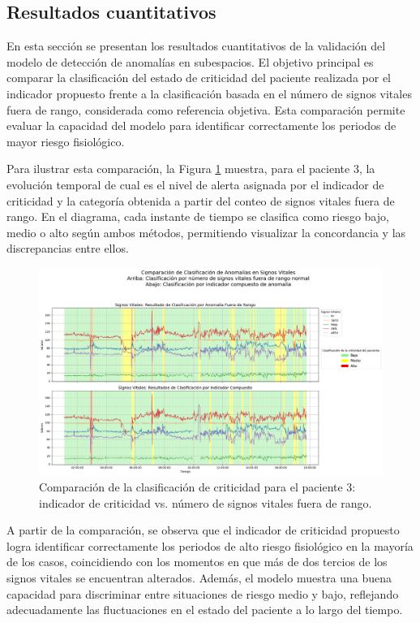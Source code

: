 \subsection{Resultados cuantitativos}

En esta sección se presentan los resultados cuantitativos de la validación del modelo de detección de anomalías en subespacios. El objetivo principal es comparar la clasificación del estado de criticidad del paciente realizada por el indicador propuesto frente a la clasificación basada en el número de signos vitales fuera de rango, considerada como referencia objetiva. Esta comparación permite evaluar la capacidad del modelo para identificar correctamente los periodos de mayor riesgo fisiológico.

Para ilustrar esta comparación, la Figura \ref{fig:comparacion_clasificacion_paciente3} muestra, para el paciente 3, la evolución temporal de cual es el nivel de alerta asignada por el indicador de criticidad y la categoría obtenida a partir del conteo de signos vitales fuera de rango. En el diagrama, cada instante de tiempo se clasifica como riesgo bajo, medio o alto según ambos métodos, permitiendo visualizar la concordancia y las discrepancias entre ellos.

\begin{figure}[ht]
  \centering
  \includegraphics[width=\textwidth]{Images/comparacion_indicador_con_fuera_de_rango.png}
  \caption{Comparación de la clasificación de criticidad para el paciente 3: indicador de criticidad vs. número de signos vitales fuera de rango.}
  \label{fig:comparacion_clasificacion_paciente3}
\end{figure}

A partir de la comparación, se observa que el indicador de criticidad propuesto logra identificar correctamente los periodos de alto riesgo fisiológico en la mayoría de los casos, coincidiendo con los momentos en que más de dos tercios de los signos vitales se encuentran alterados. Además, el modelo muestra una buena capacidad para discriminar entre situaciones de riesgo medio y bajo, reflejando adecuadamente las fluctuaciones en el estado del paciente a lo largo del tiempo.

